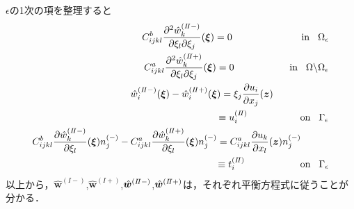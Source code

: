 $\epsilon$の1次の項を整理すると
\begin{align}
	C_{ijkl}^{b} \frac{\partial^2 \hat{w}^{(I\hspace{-.15em}I-)}_{k}} {\partial \xi_l \partial \xi_j}(\bm{\xi})=0
	\hspace{2.5cm}
	\text{in}\hspace{0.3cm}\Omega_{\epsilon}
	\label{eq:GovDisturIn2}
	\\
	C_{ijkl}^{a} \frac{\partial^2 \hat{w}^{(I\hspace{-.15em}I+)}_{k}} {\partial \xi_l \partial \xi_j}(\bm{\xi})=0
	\hspace{2.0cm}
	\text{in}\hspace{0.3cm}\Omega\backslash\Omega_{\epsilon}
	\label{eq:GovDisturOut2}
	\\
	\hat{w}_{i}^{(I\hspace{-.15em}I-)}(\bm{\xi})
		-\hat{w}_{i}^{(I\hspace{-.15em}I+)}(\bm{\xi})
	= \xi_j \frac{\partial u_{i}}{\partial x_{j}}(\bm{z})
	\hspace{2.0cm}
	\nonumber
	\\
	\equiv u_{i}^{(I\hspace{-.15em}I)}
	\hspace{1.9cm}\text{on}\hspace{0.3cm}\Gamma_{\epsilon}
	\label{eq:GovDisturUBC2}
	\\
	C_{ijkl}^{b}\frac{\partial \hat{w}^{(I\hspace{-.15em}I-)}_{k}} {\partial \xi_l}(\bm{\xi})n_{j}^{(-)}
	-C_{ijkl}^{a}\frac{\partial \hat{w}^{(I\hspace{-.15em}I+)}_{k}} {\partial \xi_l}(\bm{\xi})n_{j}^{(-)}
	=C_{ijkl}^{a}\frac{\partial u_{k}}{\partial x_{l}}(\bm{z}) n_{j}^{(-)}
	\hspace{1.0cm}
	\nonumber
	\\
	\equiv t_{i}^{(I\hspace{-.15em}I)}
	\hspace{2.0cm}\text{on}\hspace{0.3cm}\Gamma_{\epsilon}
	\label{eq:GovDisturSBC2}
\end{align}
以上から，$\hat{\bm{w}}^{(I-)}$,$\hat{\bm{w}}^{(I+)}$,$\hat{\bm{w}}^{(I\hspace{-.15em}I-)}$,$\hat{\bm{w}}^{(I\hspace{-.15em}I+)}$は，それぞれ平衡方程式に従うことが分かる．

